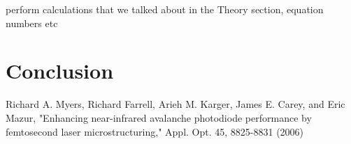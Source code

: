 \documentclass{article}
\begin{document}
perform calculations that we talked about in the Theory section, equation numbers etc

\section{Conclusion}

\begin{thebibliography}{10}
		Richard A. Myers, Richard Farrell, Arieh M. Karger, James E. Carey, and Eric Mazur, "Enhancing near-infrared avalanche photodiode performance by femtosecond laser microstructuring," Appl. Opt. 45, 8825-8831 (2006)

\end{thebibliography}
\end{document}
